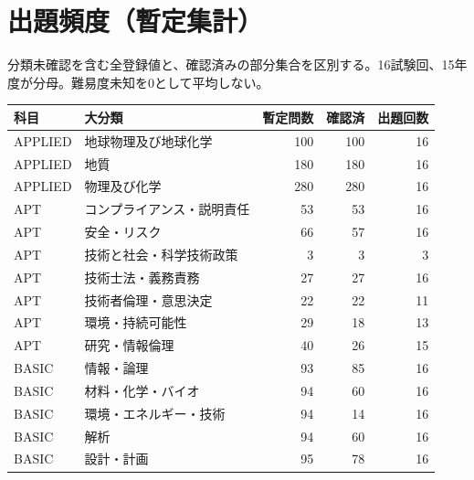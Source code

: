 \chapter{出題頻度（暫定集計）}
分類未確認を含む全登録値と、確認済みの部分集合を区別する。16試験回、15年度が分母。難易度未知を0として平均しない。
\begin{longtable}{p{.16\linewidth}p{.42\linewidth}rrr}
科目 & 大分類 & 暫定問数 & 確認済 & 出題回数\\\hline
APPLIED & 地球物理及び地球化学 & 100 & 100 & 16\\
APPLIED & 地質 & 180 & 180 & 16\\
APPLIED & 物理及び化学 & 280 & 280 & 16\\
APT & コンプライアンス・説明責任 & 53 & 53 & 16\\
APT & 安全・リスク & 66 & 57 & 16\\
APT & 技術と社会・科学技術政策 & 3 & 3 & 3\\
APT & 技術士法・義務責務 & 27 & 27 & 16\\
APT & 技術者倫理・意思決定 & 22 & 22 & 11\\
APT & 環境・持続可能性 & 29 & 18 & 13\\
APT & 研究・情報倫理 & 40 & 26 & 15\\
BASIC & 情報・論理 & 93 & 85 & 16\\
BASIC & 材料・化学・バイオ & 94 & 60 & 16\\
BASIC & 環境・エネルギー・技術 & 94 & 14 & 16\\
BASIC & 解析 & 94 & 60 & 16\\
BASIC & 設計・計画 & 95 & 78 & 16\\
\end{longtable}
